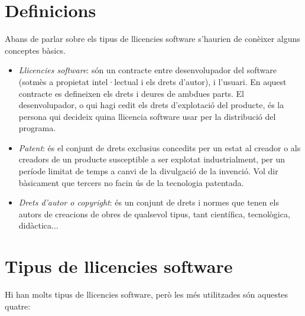 \section{Definicions}
Abans de parlar sobre els tipus de llicencies software s'haurien 
de conèixer alguns conceptes bàsics.

\begin {itemize}
	\item \emph{Llicencies software}: són un contracte entre desenvolupador 
	del software (sotmès a propietat intel·lectual i els drets d'autor), i l'usuari. 
	En aquest contracte es defineixen els drets i deures de ambdues parts. El 
	desenvolupador, o qui hagi cedit els drets d'explotació del producte, és 
	la persona qui decideix quina llicencia software usar per la distribució del 
	programa.
	\item \emph{Patent}: és el conjunt de drets exclusius concedits per un estat al 
	creador o als creadors de un producte susceptible a ser explotat industrialment, 
	per un període limitat de temps a canvi de la divulgació de la invenció. Vol dir
	bàsicament que tercers no facin ús de la tecnologia patentada. \cite {definicions}
	\item \emph{Drets d'autor o \textit{copyright}}: és un conjunt de drets i normes \cite {copyright}
	que tenen els autors de creacions de obres de qualsevol tipus, tant científica, 
	tecnològica, didàctica...
\end {itemize}

\section{Tipus de llicencies software}
Hi han molts tipus de llicencies software, però les més utilitzades són aquestes quatre:

